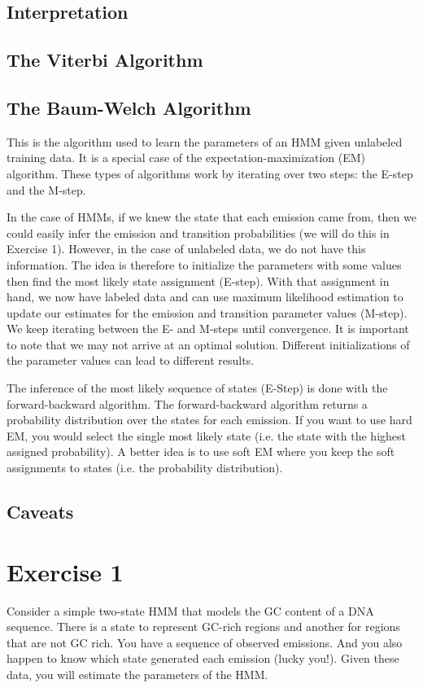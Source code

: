 \documentclass[11pt, oneside]{article}
\begin{document}
\subsection{Interpretation}
\subsection{The Viterbi Algorithm}
\subsection{The Baum-Welch Algorithm}

This is the algorithm used to learn the parameters of an HMM given unlabeled training data. 
It is a special case of the expectation-maximization (EM) algorithm. These types of algorithms work by iterating over two steps: the E-step and the M-step.

In the case of HMMs, if we knew the state that each emission came from, then we could easily infer the emission and transition probabilities (we will do this in Exercise 1). However, in the case of unlabeled data, we do not have this information. The idea is therefore to initialize the parameters with some values then find the most likely state assignment (E-step). With that assignment in hand, we now have labeled data and can use maximum likelihood estimation to update our estimates for the emission and transition parameter values (M-step). We keep iterating between the E- and M-steps until convergence. It is important to note that we may not arrive at an optimal solution. Different initializations of the parameter values can lead to different results.

The inference of the most likely sequence of states (E-Step) is done with the forward-backward algorithm. The forward-backward algorithm returns a probability distribution over the states for each emission. If you want to use hard EM, you would select the single most likely state (i.e. the state with the highest assigned probability). A better idea is to use soft EM where you keep the soft assignments to states (i.e. the probability distribution).

\subsection{Caveats}

\section{Exercise 1}
Consider a simple two-state HMM that models the GC content of a DNA sequence. 
There is a state to represent GC-rich regions and another for regions that are not GC rich.
You have a sequence of observed emissions. 
And you also happen to know which state generated each emission (lucky you!). 
Given these data, you will estimate the parameters of the HMM. 
\end{document}

